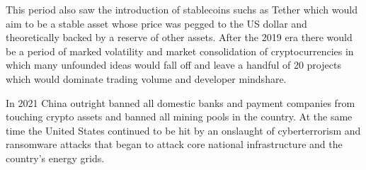 
This period also saw the introduction of stablecoins suchs as Tether which would
aim to be a stable asset whose price was pegged to the US dollar and
theoretically backed by a reserve of other assets. After the 2019 era there
would be a period of marked volatility and market consolidation of
cryptocurrencies in which many unfounded ideas would fall off and leave a
handful of 20 projects which would dominate trading volume and developer
mindshare.


In 2021 China outright banned all domestic banks and payment companies from
touching crypto assets and banned all mining pools in the country. At the same
time the United States continued to be hit by an onslaught of cyberterrorism and
ransomware attacks that began to attack core national infrastructure and the
country's energy grids.

